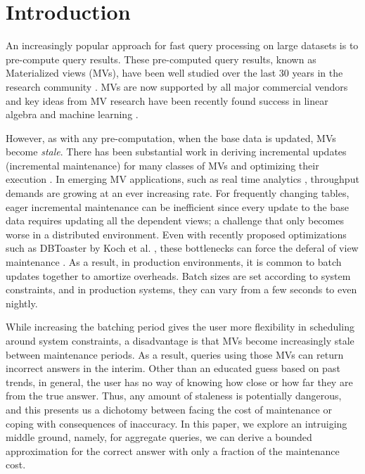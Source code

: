 \vspace{-0.5em}
\section{Introduction}
An increasingly popular approach for fast query processing on large datasets is to pre-compute query results.
These pre-computed query results, known as Materialized views (MVs), have been well studied over the last 30 years in the
research community \cite{LarsonY85, gupta1995maintenance, chirkova2011materialized}.
MVs are now supported by all major commercial vendors and key ideas from MV research have been recently found success in linear algebra and machine learning \cite{nikolic2014linview, zhang2014mat}.

However, as with any pre-computation, when the base data is updated, MVs become \emph{stale}. 
There has been substantial work in deriving incremental updates (incremental maintenance) for many classes of MVs and optimizing their execution \cite{chirkova2011materialized, DBLP:journals/vldb/KochAKNNLS14}.
In emerging MV applications, such as real time analytics \cite{rainbird}, throughput demands are growing at an ever increasing rate.
For frequently changing tables, eager incremental maintenance can be inefficient since every update to the base data requires updating all the dependent views; a challenge that only becomes worse in a distributed environment.
Even with recently proposed optimizations such as DBToaster by Koch et al. \cite{DBLP:journals/vldb/KochAKNNLS14}, these bottlenecks can force the deferal of view
maintenance \cite{chirkova2011materialized, zhou2007lazy, DBLP:conf/sigmod/ColbyGLMT96}.
As a result, in production environments, it is common to batch updates together to amortize overheads.
Batch sizes are set according to system constraints, and in production systems, they can vary from a few seconds to even nightly.  

While increasing the batching period gives the user more flexibility in scheduling around system constraints, a disadvantage is that MVs become increasingly stale between maintenance periods.
As a result, queries using those MVs can return incorrect answers in the interim.
Other than an educated guess based on past trends, in general, the user has no way of knowing how close or how far they are from the true answer.
Thus, any amount of staleness is potentially dangerous, and this presents us a dichotomy between facing the cost of maintenance or coping with consequences of inaccuracy.
In this paper, we explore an intruiging middle ground, namely, for aggregate queries, we can derive a bounded approximation for the correct answer with only a fraction of the maintenance cost. 

